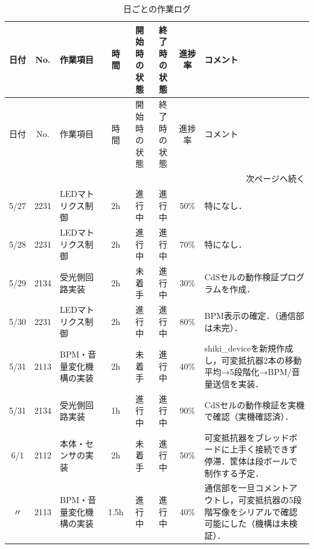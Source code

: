 \documentclass[uplatex,dvipdfmx,a4paper,11pt]{jsarticle}
\begin{document}
    \renewcommand{\arraystretch}{1.2}

    \small

    \begin{longtable}{|c|c|p{2.4cm}|c|c|c|c|p{3.8cm}|}
    \caption{日ごとの作業ログ} \\
    \hline
    日付 & No. & 作業項目 & 時間 & 開始時の状態 & 終了時の状態 & 進捗率 & コメント \\
    \hline
    \endfirsthead

    \hline
    日付 & No. & 作業項目 & 時間 & 開始時の状態 & 終了時の状態 & 進捗率 & コメント \\
    \hline
    \endhead

    \hline
    \multicolumn{8}{r}{次ページへ続く} \\
    \hline
    \endfoot

    \hline
    \endlastfoot

    5/27 & 2231 & LEDマトリクス制御 & 2h &
    進行中 &
    進行中 &
    50\% &
    特になし． \\
    \hline

    5/28 & 2231 & LEDマトリクス制御 & 2h &
    進行中 &
    進行中 &
    70\% &
    特になし． \\
    \hline

    5/29 & 2134 & 受光側回路実装 & 2h &
    未着手 &
    進行中 &
    30\% &
    CdSセルの動作検証プログラムを作成． \\
    \hline

    5/30 & 2231 & LEDマトリクス制御 & 2h &
    進行中 &
    進行中 &
    80\% &
    BPM表示の確定．（通信部は未完）． \\
    \hline


    5/31 & 2113 & BPM・音量変化機構の実装 & 2h &
    未着手 &
    進行中 &
    40\% &
    shiki\_deviceを新規作成し，可変抵抗器2本の移動平均→5段階化→BPM/音量送信を実装． \\
    \hline

    5/31 & 2134 & 受光側回路実装 & 1h &
    進行中 &
    進行中 &
    90\% &
    CdSセルの動作検証を実機で確認（実機確認済）． \\
    \hline

    6/1 & 2112 & 本体・センサの実装 & 2h &
    未着手 &
    進行中 &
    50\% &
    可変抵抗器をブレッドボードに上手く接続できず停滞．筐体は段ボールで制作する予定． \\
    \hline

    〃 & 2113 & BPM・音量変化機構の実装 & 1.5h &
    進行中 &
    進行中 &
    40\% &
    通信部を一旦コメントアウトし，可変抵抗器の5段階写像をシリアルで確認可能にした（機構は未検証）． \\
    \hline


\end{longtable}
\end{document}
